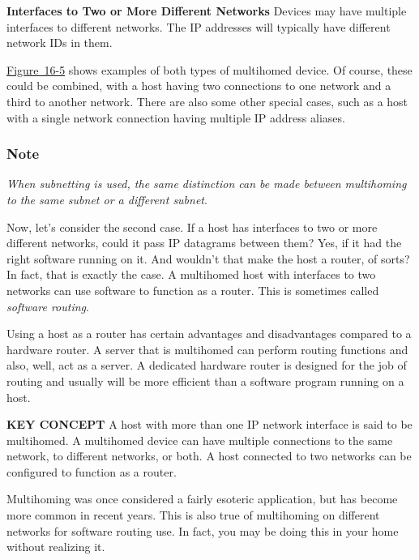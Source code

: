 {\textbf{Interfaces to Two or More Different Networks}} Devices may have
multiple interfaces to different networks. The
\protect\hypertarget{ch16s05.htmlux5cux23idx-CHP-16-0669}{}{}IP
addresses will typically have different network IDs in them.

\protect\hyperlink{ch16s06.htmlux5cux23multihomed_devices_on_an_ip_internetwork}{Figure~16-5}
shows examples of both types of multihomed device. Of course, these
could be combined, with a host having two connections to one network and
a third to another network. There are also some other special cases,
such as a host with a single network connection having multiple IP
address aliases.

\subsubsection[Note]{\texorpdfstring{\protect\hypertarget{ch16s05.htmlux5cux23note-63}{}{}Note}{Note}}

{\emph{When subnetting is used, the same distinction can be made between
multihoming to the same subnet or a different subnet}}.

Now, let's consider the second case. If a host has interfaces to two or
more different networks, could it pass IP datagrams between them? Yes,
if it had the right
\protect\hypertarget{ch16s05.htmlux5cux23idx-CHP-16-0670}{}{}software
running on it. And wouldn't that make the host a router, of sorts? In
fact, that is exactly the case. A multihomed host with interfaces to two
networks can use software to function as a router. This is sometimes
called
\protect\hypertarget{ch16s05.htmlux5cux23idx-CHP-16-0671}{}{}{\emph{software
routing}}.

Using a host as a router has certain advantages and disadvantages
compared to a hardware router. A server that is multihomed can perform
routing functions and also, well, act as a server. A dedicated hardware
router is designed for the job of routing and usually will be more
efficient than a software program running on a host.


{\textbf{KEY CONCEPT}} A host with more than one IP network interface is
said to be multihomed. A multihomed device can have multiple connections
to the same network, to different networks, or both. A host connected to
two networks can be configured to function as a router.

Multihoming was once considered a fairly esoteric application, but has
become more common in recent years. This is also true of multihoming on
different networks for software routing use. In fact, you may be doing
this in your home without realizing it.

